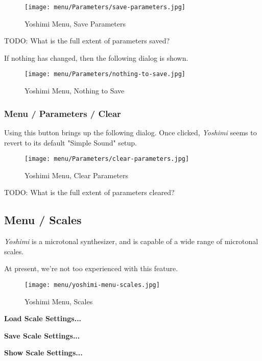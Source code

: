 \begin{figure}[H]
   \centering 
   \texttt{[image: menu/Parameters/save-parameters.jpg]}
   \caption{Yoshimi Menu, Save Parameters}
   \label{fig:yoshimi_menu_save_parameters}
\end{figure}

   TODO:  What is the full extent of parameters saved?

   If nothing has changed, then the following dialog is shown.

\begin{figure}[H]
   \centering 
   \texttt{[image: menu/Parameters/nothing-to-save.jpg]}
   \caption{Yoshimi Menu, Nothing to Save}
   \label{fig:yoshimi_menu_nothing_to_save_parameters}
\end{figure}

\subsubsection{Menu / Parameters / Clear}
\label{subsubsec:menu_parameters_clear}

   Using this button brings up the following dialog.  Once clicked,
   \textsl{Yoshimi} seems to revert to its default "Simple Sound" setup.

\begin{figure}[H]
   \centering 
   \texttt{[image: menu/Parameters/clear-parameters.jpg]}
   \caption{Yoshimi Menu, Clear Parameters}
   \label{fig:yoshimi_menu_clear_parameters}
\end{figure}

   TODO:  What is the full extent of parameters cleared?

\subsection{Menu / Scales}
\label{subsec:menu_scales}

   \textsl{Yoshimi} is a microtonal synthesizer, and is capable of a wide
   range of microtonal scales.

   At present, we're not too experienced with this feature.

\begin{figure}[H]
   \centering 
   \texttt{[image: menu/yoshimi-menu-scales.jpg]}
   \caption{Yoshimi Menu, Scales}
   \label{fig:yoshimi_menu_scales}
\end{figure}

   \begin{enumber}
      \item \textbf{Load Scale Settings...}
      \item \textbf{Save Scale Settings...}
      \item \textbf{Show Scale Settings...}
   \end{enumber}


